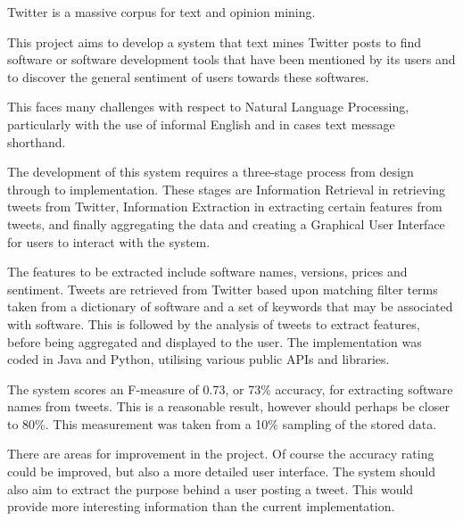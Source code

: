 Twitter is a massive corpus for text and opinion mining.

This project aims to develop a system that text mines Twitter posts to find software or software development tools that have been mentioned by its users and to discover the general sentiment of users towards these softwares.

This faces many challenges with respect to Natural Language Processing, particularly with the use of informal English and in cases text message shorthand.

The development of this system requires a three-stage process from design through to implementation. These stages are Information Retrieval in retrieving tweets from Twitter, Information Extraction in extracting certain features from tweets, and finally aggregating the data and creating a Graphical User Interface for users to interact with the system.

The features to be extracted include software names, versions, prices and sentiment. Tweets are retrieved from Twitter based upon matching filter terms taken from a dictionary of software and a set of keywords that may be associated with software. This is followed by the analysis of tweets to extract features, before being aggregated and displayed to the user. The implementation was coded in Java and Python, utilising various public APIs and libraries.

The system scores an F-measure of 0.73, or 73\% accuracy, for extracting software names from tweets. This is a reasonable result, however should perhaps be closer to 80\%. This measurement was taken from a 10\% sampling of the stored data. 

There are areas for improvement in the project. Of course the accuracy rating could be improved, but also a more detailed user interface. The system should also aim to extract the purpose behind a user posting a tweet. This would provide more interesting information than the current implementation.

